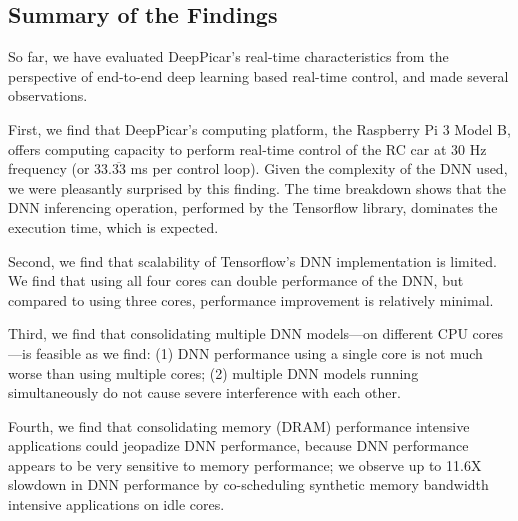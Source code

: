 % 

\subsection{Summary of the Findings}
So far, we have evaluated DeepPicar's real-time
characteristics from the perspective of end-to-end deep learning based
real-time control, and made several observations.

First, we find that DeepPicar's computing platform,
the Raspberry Pi 3 Model B, offers computing capacity to
perform real-time control of the RC car at 30 Hz frequency (or
33.$\overline{\mbox{33}}$ ms  per control loop). Given the complexity of 
the DNN used, we were pleasantly surprised by this finding. 
The time breakdown shows that the DNN inferencing operation, 
performed by the Tensorflow library, dominates the execution time, 
which is expected.

Second, we find that scalability of Tensorflow's DNN 
implementation is limited. We find that using all four cores can double 
performance of the DNN, but compared to using three cores, performance
improvement is relatively minimal.

Third, we find that consolidating multiple DNN models---on different CPU
cores---is feasible as we find: (1) DNN performance using a single
core is not much worse than using multiple cores; (2) multiple DNN
models running simultaneously do not cause severe interference with
each other.

Fourth, we find that consolidating memory (DRAM) performance
intensive applications could jeopadize DNN performance, because DNN
performance appears to be very sensitive to memory performance; we 
observe up to 11.6X slowdown in DNN performance by co-scheduling 
synthetic memory bandwidth intensive applications on idle cores.

